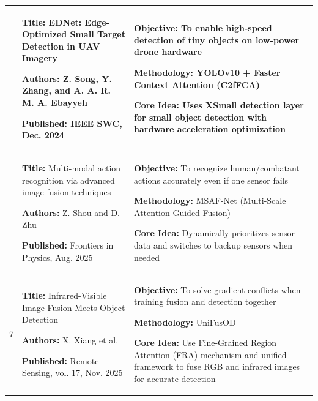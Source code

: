 \begin{center}
\begin{longtable}{
        |>{\centering\arraybackslash}p{1.22cm}
        |>{\raggedright\arraybackslash}p{6.3cm}
        |>{\raggedright\arraybackslash}p{6.3cm}|
        }
        5                                                                                            &
        \textbf{Title:} EDNet: Edge-Optimized Small Target Detection in UAV Imagery \par
        \textbf{Authors:} Z. Song, Y. Zhang, and A. A. R. M. A. Ebayyeh \par
        \textbf{Published:} IEEE SWC, Dec. 2024                                                      &
        \textbf{Objective:} To enable high-speed detection of tiny objects on low-power drone hardware \par
        \textbf{Methodology:} YOLOv10 + Faster Context Attention (C2fFCA) \par
        \textbf{Core Idea:} Uses XSmall detection layer for small object detection with hardware acceleration optimization                                                                               \\
        \hline

        6                                                                                            &
        \textbf{Title:} Multi-modal action recognition via advanced image fusion techniques \par
        \textbf{Authors:} Z. Shou and D. Zhu \par
        \textbf{Published:} Frontiers in Physics, Aug. 2025                                          &
        \textbf{Objective:} To recognize human/combatant actions accurately even if one sensor fails \par
        \textbf{Methodology:} MSAF-Net (Multi-Scale Attention-Guided Fusion) \par
        \textbf{Core Idea:} Dynamically prioritizes sensor data and switches to backup sensors when needed                                                                                               \\
        \hline

        7                                                                                            &
        \textbf{Title:} Infrared-Visible Image Fusion Meets Object Detection \par
        \textbf{Authors:} X. Xiang et al. \par
        \textbf{Published:} Remote Sensing, vol. 17, Nov.
        2025                                                                                         &
        \textbf{Objective:} To solve gradient conflicts when training fusion and detection together \par
        \textbf{Methodology:} UniFusOD \par
        \textbf{Core Idea:} Use Fine-Grained Region Attention (FRA) mechanism and unified framework to fuse RGB and infrared images for accurate detection                                               \\
        \hline


\end{longtable}
\end{center}
